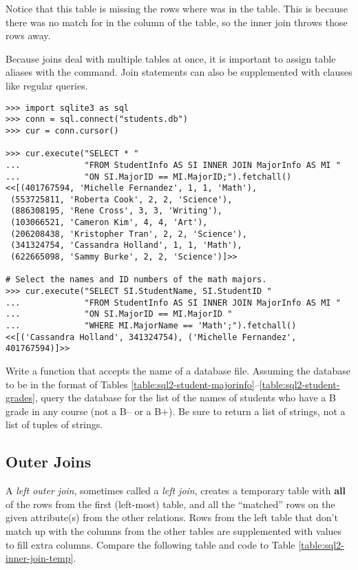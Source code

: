 Notice that this table is missing the rows where  was  in the  table.
This is because there was no match for  in the  column of the  table, so the inner join throws those rows away.

Because joins deal with multiple tables at once, it is important to assign table aliases with the  command.
Join statements can also be supplemented with  clauses like regular queries.

\begin{lstlisting}
>>> import sqlite3 as sql
>>> conn = sql.connect("students.db")
>>> cur = conn.cursor()

>>> cur.execute("SELECT * "
...             "FROM StudentInfo AS SI INNER JOIN MajorInfo AS MI "
...             "ON SI.MajorID == MI.MajorID;").fetchall()
<<[(401767594, 'Michelle Fernandez', 1, 1, 'Math'),
 (553725811, 'Roberta Cook', 2, 2, 'Science'),
 (886308195, 'Rene Cross', 3, 3, 'Writing'),
 (103066521, 'Cameron Kim', 4, 4, 'Art'),
 (206208438, 'Kristopher Tran', 2, 2, 'Science'),
 (341324754, 'Cassandra Holland', 1, 1, 'Math'),
 (622665098, 'Sammy Burke', 2, 2, 'Science')]>>

# Select the names and ID numbers of the math majors.
>>> cur.execute("SELECT SI.StudentName, SI.StudentID "
...             "FROM StudentInfo AS SI INNER JOIN MajorInfo AS MI "
...             "ON SI.MajorID == MI.MajorID "
...             "WHERE MI.MajorName == 'Math';").fetchall()
<<[('Cassandra Holland', 341324754), ('Michelle Fernandez', 401767594)]>>
\end{lstlisting}

\begin{problem} %
Write a function that accepts the name of a database file.
Assuming the database to be in the format of Tables \ref{table:sql2-student-majorinfo}--\ref{table:sql2-student-grades}, query the database for the list of the names of students who have a B grade in any course (not a B-- or a B+). 
Be sure to return a list of strings, not a list of tuples of strings.
\end{problem}

\subsection*{Outer Joins} %

A \emph{left outer join}, sometimes called a \emph{left join}, creates a temporary table with \textbf{all} of the rows from the first (left-most) table, and all the ``matched'' rows on the given attribute(s) from the other relations.
Rows from the left table that don't match up with the columns from the other tables are supplemented with  values to fill extra columns.
Compare the following table and code to Table \ref{table:sql2-inner-join-temp}.

